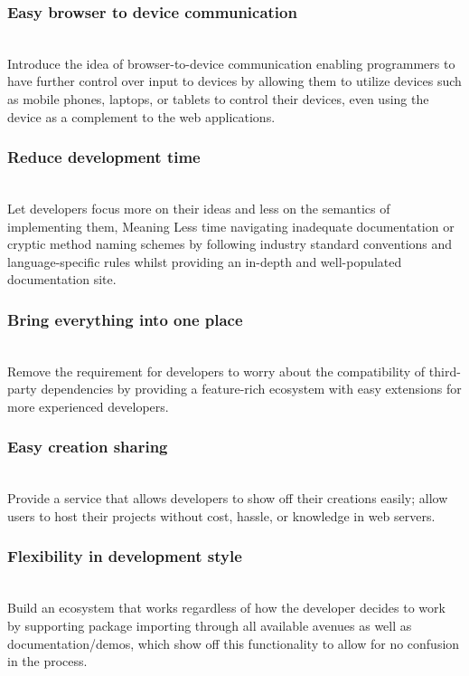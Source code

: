 \documentclass{l4proj}
\begin{document}
\subsubsection{Easy browser to device communication} \hfill\\
\text Introduce the idea of browser-to-device communication enabling programmers to have further control over input to devices by allowing them to utilize devices such as mobile phones, laptops, or tablets to control their devices, even using the device as a complement to the web applications.
\\
\subsubsection{Reduce development time} \hfill\\
\text Let developers focus more on their ideas and less on the semantics of implementing them, Meaning Less time navigating inadequate documentation or cryptic method naming schemes by following industry standard conventions and language-specific rules whilst providing an in-depth and well-populated documentation site.
\\
\subsubsection{Bring everything into one place} \hfill\\
\text Remove the requirement for developers to worry about the compatibility of third-party dependencies by providing a feature-rich ecosystem with easy extensions for more experienced developers.
\\
\subsubsection{Easy creation sharing}\hfill\\
\text Provide a service that allows developers to show off their creations easily; allow users to host their projects without cost, hassle, or knowledge in web servers.
\\
\subsubsection{Flexibility in development style}\hfill\\
\text Build an ecosystem that works regardless of how the developer decides to work by supporting package importing through all available avenues as well as documentation/demos, which show off this functionality to allow for no confusion in the process.
\end{document}
